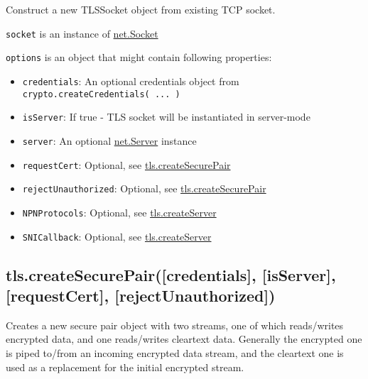 Construct a new TLSSocket object from existing TCP socket.

\texttt{socket} is an instance of
\href{net.html\#net\_class\_net\_socket}{net.Socket}

\texttt{options} is an object that might contain following properties:

\begin{itemize}
\item
  \texttt{credentials}: An optional credentials object from
  \texttt{crypto.createCredentials( ... )}
\item
  \texttt{isServer}: If true - TLS socket will be instantiated in
  server-mode
\item
  \texttt{server}: An optional
  \href{net.html\#net\_class\_net\_server}{net.Server} instance
\item
  \texttt{requestCert}: Optional, see
  \hyperref[tls\_tls\_createsecurepair\_credentials\_isserver\_requestcert\_rejectunauthorized]{tls.createSecurePair}
\item
  \texttt{rejectUnauthorized}: Optional, see
  \hyperref[tls\_tls\_createsecurepair\_credentials\_isserver\_requestcert\_rejectunauthorized]{tls.createSecurePair}
\item
  \texttt{NPNProtocols}: Optional, see
  \hyperref[tls\_tls\_createserver\_options\_secureconnectionlistener]{tls.createServer}
\item
  \texttt{SNICallback}: Optional, see
  \hyperref[tls\_tls\_createserver\_options\_secureconnectionlistener]{tls.createServer}
\end{itemize}

\subsection{tls.createSecurePair({[}credentials{]}, {[}isServer{]},
{[}requestCert{]}, {[}rejectUnauthorized{]})}

\begin{Shaded}
\begin{Highlighting}[]
\NormalTok{: } \NormalTok{- } 
\end{Highlighting}
\end{Shaded}

Creates a new secure pair object with two streams, one of which
reads/writes encrypted data, and one reads/writes cleartext data.
Generally the encrypted one is piped to/from an incoming encrypted data
stream, and the cleartext one is used as a replacement for the initial
encrypted stream.

